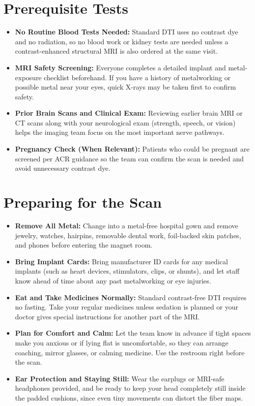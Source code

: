 \section{Prerequisite Tests}

\begin{itemize}
    \item \textbf{No Routine Blood Tests Needed:} Standard DTI uses no contrast dye and no radiation, so no blood work or kidney tests are needed unless a contrast-enhanced structural MRI is also ordered at the same visit.
    \item \textbf{MRI Safety Screening:} Everyone completes a detailed implant and metal-exposure checklist beforehand. If you have a history of metalworking or possible metal near your eyes, quick X-rays may be taken first to confirm safety.
    \item \textbf{Prior Brain Scans and Clinical Exam:} Reviewing earlier brain MRI or CT scans along with your neurological exam (strength, speech, or vision) helps the imaging team focus on the most important nerve pathways.
    \item \textbf{Pregnancy Check (When Relevant):} Patients who could be pregnant are screened per ACR guidance so the team can confirm the scan is needed and avoid unnecessary contrast dye.
\end{itemize}

\section{Preparing for the Scan}

\begin{itemize}
    \item \textbf{Remove All Metal:} Change into a metal-free hospital gown and remove jewelry, watches, hairpins, removable dental work, foil-backed skin patches, and phones before entering the magnet room.
    \item \textbf{Bring Implant Cards:} Bring manufacturer ID cards for any medical implants (such as heart devices, stimulators, clips, or shunts), and let staff know ahead of time about any past metalworking or eye injuries.
    \item \textbf{Eat and Take Medicines Normally:} Standard contrast-free DTI requires no fasting. Take your regular medicines unless sedation is planned or your doctor gives special instructions for another part of the MRI.
    \item \textbf{Plan for Comfort and Calm:} Let the team know in advance if tight spaces make you anxious or if lying flat is uncomfortable, so they can arrange coaching, mirror glasses, or calming medicine. Use the restroom right before the scan.
    \item \textbf{Ear Protection and Staying Still:} Wear the earplugs or MRI-safe headphones provided, and be ready to keep your head completely still inside the padded cushions, since even tiny movements can distort the fiber maps.
\end{itemize}

